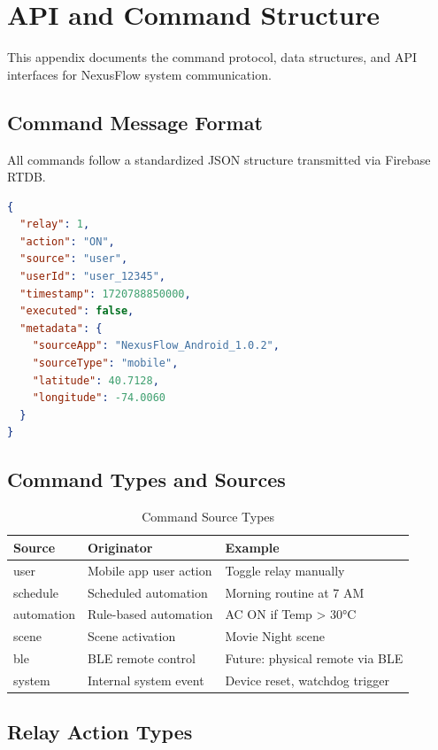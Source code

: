 \section{API and Command Structure}

This appendix documents the command protocol, data structures, and API interfaces for NexusFlow system communication.

\subsection{Command Message Format}

All commands follow a standardized JSON structure transmitted via Firebase RTDB.

\begin{lstlisting}[language=json, caption=Command Message Structure, label=lst:command_format]
{
  "relay": 1,
  "action": "ON",
  "source": "user",
  "userId": "user_12345",
  "timestamp": 1720788850000,
  "executed": false,
  "metadata": {
    "sourceApp": "NexusFlow_Android_1.0.2",
    "sourceType": "mobile",
    "latitude": 40.7128,
    "longitude": -74.0060
  }
}
\end{lstlisting}

\subsection{Command Types and Sources}

\begin{table}[H]
\centering
\caption{Command Source Types}
\label{tbl:command_sources}
\begin{tabular}{|l|l|l|}
\hline
\textbf{Source} & \textbf{Originator} & \textbf{Example} \\
\hline
user & Mobile app user action & Toggle relay manually \\
\hline
schedule & Scheduled automation & Morning routine at 7 AM \\
\hline
automation & Rule-based automation & AC ON if Temp > 30°C \\
\hline
scene & Scene activation & Movie Night scene \\
\hline
ble & BLE remote control & Future: physical remote via BLE \\
\hline
system & Internal system event & Device reset, watchdog trigger \\
\hline
\end{tabular}
\end{table}

\subsection{Relay Action Types}

